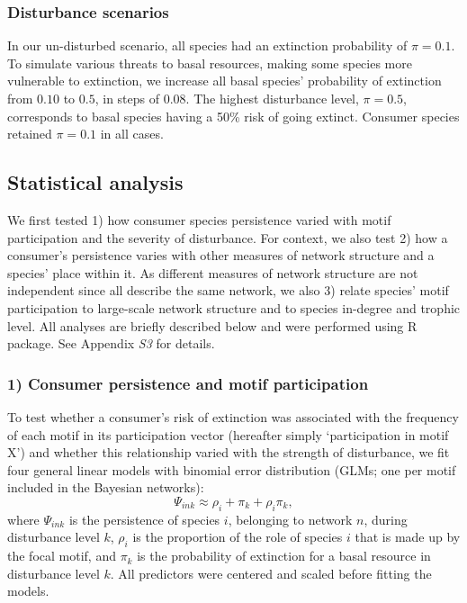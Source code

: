 \documentclass[12pt]{article}
\begin{document}
\begin{spacing}{2.0}
	
		
        \subsubsection*{Disturbance scenarios}
        
            In our un-disturbed scenario, all species had an extinction probability of $\pi = 0.1$. 
            To simulate various threats to basal resources, making some species more vulnerable to extinction, we increase all basal species' probability of extinction from $0.10$ to $0.5$, in steps of $0.08$. 
            The highest disturbance level, $\pi = 0.5$, corresponds to basal species having a 50\% risk of going extinct. 
            Consumer species retained $\pi=0.1$ in all cases.


	\subsection*{Statistical analysis} 

        We first tested 1) how consumer species persistence varied with motif participation and the severity of disturbance.
        For context, we also test 2) how a consumer's persistence varies with other measures of network structure and a species' place within it.
        As different measures of network structure are not independent since all describe the same network, we also 3) relate species' motif participation to large-scale network structure and to species in-degree and trophic level.
        All analyses are briefly described below and were performed using  R~\citep{R} package. %
        See Appendix \emph{S3} for details. 

        
        \subsubsection*{1) Consumer persistence and motif participation}

            To test whether a consumer's risk of extinction was associated with the frequency of each motif in its participation vector (hereafter simply `participation in motif X') and whether this relationship varied with the strength of disturbance, we fit four general linear models with binomial error distribution (GLMs; one per motif included in the Bayesian networks):
            \begin{equation}
            \Psi_{ink} \approx \rho_{i} + \pi_{k} + \rho_{i}\pi_{k} ,
            \label{propreq}
            \end{equation}
            \noindent where $\Psi_{ink}$ is the persistence of species $i$, belonging to network $n$, during disturbance level $k$, $\rho_{i}$ is the proportion of the role of species $i$ that is made up by the focal motif, and $\pi_k$ is the probability of extinction for a basal resource in disturbance level $k$.
            All predictors were centered and scaled before fitting the models.         


\end{spacing}
\end{document}
